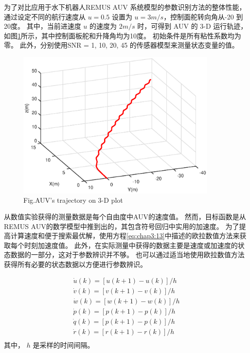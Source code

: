 为了对比应用于水下机器人REMUS AUV 系统模型的参数识别方法的整体性能，通过设定不同的航行速度从 $u = 0.5$ 设置为 $u = 3m/s$，控制面舵转向角从-20 到 20度。 其中，当前进速度 $u$ 的速度为 $2 m/s$ 时，可得到 AUV 的 3-D 运行轨迹，如图\ref{fig:chap3:F3}所示，其中控制面板舵和升降角均为10度。 初始条件是所有粘性系数均为零。 此外，分别使用SNR = 1, 10, 20, 45 的传感器模型来测量状态变量的值。

\begin{figure}[!htp]
\centering
\includegraphics[width=10cm]{figure/chap3/trajectory_anlge_10_u_2.eps}
\label{fig:chap3:F3}
 {Fig.}{AUV's trajectory on 3-D plot}
\end{figure}

从数值实验获得的测量数据是每个自由度中AUV的速度值。 然而，目标函数是从REMUS AUV的数学模型中推到出的，其包含符号回归中实用的加速度。 为了提高计算速度和便于搜索最优解，使用方程\ref{eq:chap3:13}中描述的欧拉数值方法来获取每个时刻加速度值。 此外，在实际测量中获得的数据主要是速度或加速度的状态数据的一部分，这对于参数辨识并不够。 也可以通过适当地使用欧拉数值方法获得所有必要的状态数据以方便进行参数辨识。

\begin{equation}
\begin{array}{l}
\label{eq:chap3:13}
 \dot u\left( k \right) = \left[ {u\left( {k + 1} \right) - u\left( k \right)} \right]/h \\
 \dot v\left( k \right) = \left[ {v\left( {k + 1} \right) - v\left( k \right)} \right]/h \\
 \dot w\left( k \right) = \left[ {w\left( {k + 1} \right) - w\left( k \right)} \right]/h \\
 \dot p\left( k \right) = \left[ {p\left( {k + 1} \right) - p\left( k \right)} \right]/h \\
 \dot q\left( k \right) = \left[ {p\left( {k + 1} \right) - p\left( k \right)} \right]/h \\
 \dot r\left( k \right) = \left[ {r\left( {k + 1} \right) - r\left( k \right)} \right]/h \\
 \end{array}
 \end{equation}
其中， $h$ 是采样的时间间隔。

